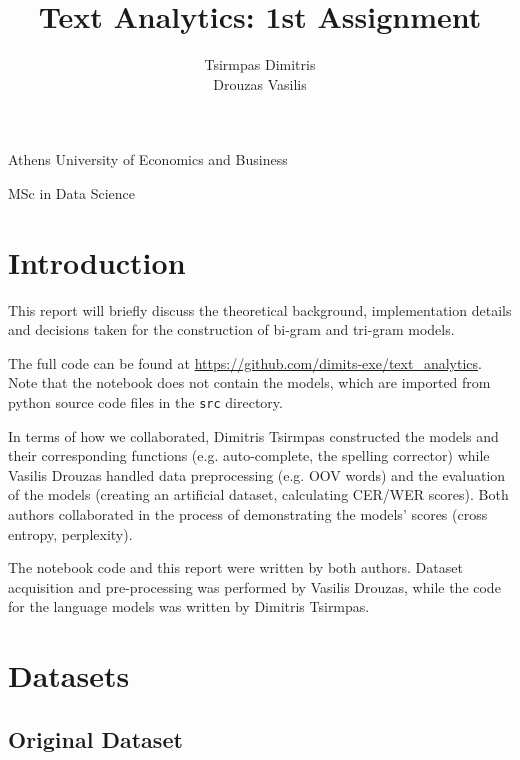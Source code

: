 \documentclass[11pt, a4paper]{article}
\title{\Huge Text Analytics: 1st Assignment}
\author{\LARGE Tsirmpas Dimitris\\\LARGE Drouzas Vasilis}
\begin{document}
	
	\begin{titlepage}
		\maketitle
		\begin{center}
			
			\large Athens University of Economics and Business
			
			\large MSc in Data Science
			
		\end{center}
		
	\end{titlepage}
	
	\tableofcontents
	\newpage	
	
	\section{Introduction}
	
	This report will briefly discuss the theoretical background, implementation details and decisions taken for the construction of bi-gram and tri-gram models.
	
 
	The full code can be found at \url{https://github.com/dimits-exe/text_analytics}. Note that the notebook does not contain the models, which are imported from python source code files in the \texttt{src} directory.

    In terms of how we collaborated, Dimitris Tsirmpas constructed the models and their corresponding functions (e.g. auto-complete, the spelling corrector) while Vasilis Drouzas handled data preprocessing (e.g. OOV words) and the evaluation of the models (creating an artificial dataset, calculating CER/WER scores). Both authors collaborated in the process of demonstrating the models' scores (cross entropy, perplexity). 
    
    The notebook code and this report were written by both authors. Dataset acquisition and pre-processing was performed by Vasilis Drouzas, while the code for the language models was written by Dimitris Tsirmpas.
	
	\section{Datasets}
	
	
	\subsection{Original Dataset}
	
\end{document}

